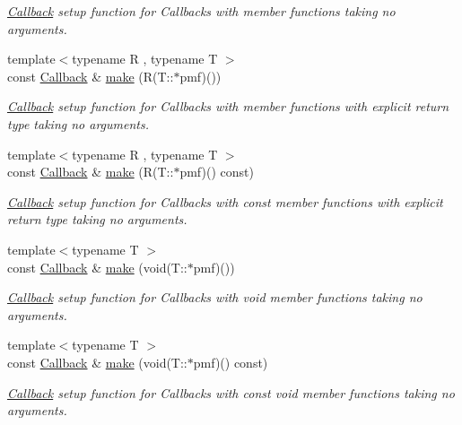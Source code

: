 \begin{DoxyCompactItemize}
\begin{DoxyCompactList}\small\item\em \hyperlink{class_d_d4hep_1_1_callback}{Callback} setup function for Callbacks with member functions taking no arguments. \end{DoxyCompactList}\item 
{\footnotesize template$<$typename R , typename T $>$ }\\const \hyperlink{class_d_d4hep_1_1_callback}{Callback} \& \hyperlink{class_d_d4hep_1_1_callback_a3aa6b0364a554486845069dc02bfc4ef}{make} (R(T\+::$\ast$pmf)())
\begin{DoxyCompactList}\small\item\em \hyperlink{class_d_d4hep_1_1_callback}{Callback} setup function for Callbacks with member functions with explicit return type taking no arguments. \end{DoxyCompactList}\item 
{\footnotesize template$<$typename R , typename T $>$ }\\const \hyperlink{class_d_d4hep_1_1_callback}{Callback} \& \hyperlink{class_d_d4hep_1_1_callback_a5c1398bc61f92efeb4f88496f528f525}{make} (R(T\+::$\ast$pmf)() const)
\begin{DoxyCompactList}\small\item\em \hyperlink{class_d_d4hep_1_1_callback}{Callback} setup function for Callbacks with const member functions with explicit return type taking no arguments. \end{DoxyCompactList}\item 
{\footnotesize template$<$typename T $>$ }\\const \hyperlink{class_d_d4hep_1_1_callback}{Callback} \& \hyperlink{class_d_d4hep_1_1_callback_a51a6c79e5f292d5aba9c3dcd104d53cf}{make} (void(T\+::$\ast$pmf)())
\begin{DoxyCompactList}\small\item\em \hyperlink{class_d_d4hep_1_1_callback}{Callback} setup function for Callbacks with void member functions taking no arguments. \end{DoxyCompactList}\item 
{\footnotesize template$<$typename T $>$ }\\const \hyperlink{class_d_d4hep_1_1_callback}{Callback} \& \hyperlink{class_d_d4hep_1_1_callback_aca07f39912775acf30d57143a5bda47b}{make} (void(T\+::$\ast$pmf)() const)
\begin{DoxyCompactList}\small\item\em \hyperlink{class_d_d4hep_1_1_callback}{Callback} setup function for Callbacks with const void member functions taking no arguments. \end{DoxyCompactList}\item 

\end{DoxyCompactItemize}
